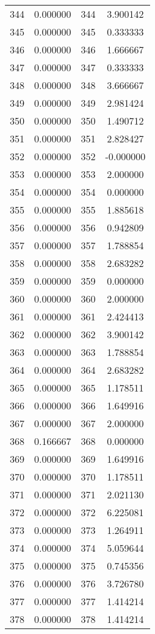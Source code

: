 \documentclass[12pt]{article}
\begin{document}
\begin{longtable}{@{}cccc@{}}
344 & 0.000000 & 344 & 3.900142 \\
345 & 0.000000 & 345 & 0.333333 \\
346 & 0.000000 & 346 & 1.666667 \\
347 & 0.000000 & 347 & 0.333333 \\
348 & 0.000000 & 348 & 3.666667 \\
349 & 0.000000 & 349 & 2.981424 \\
350 & 0.000000 & 350 & 1.490712 \\
351 & 0.000000 & 351 & 2.828427 \\
352 & 0.000000 & 352 & -0.000000 \\
353 & 0.000000 & 353 & 2.000000 \\
354 & 0.000000 & 354 & 0.000000 \\
355 & 0.000000 & 355 & 1.885618 \\
356 & 0.000000 & 356 & 0.942809 \\
357 & 0.000000 & 357 & 1.788854 \\
358 & 0.000000 & 358 & 2.683282 \\
359 & 0.000000 & 359 & 0.000000 \\
360 & 0.000000 & 360 & 2.000000 \\
361 & 0.000000 & 361 & 2.424413 \\
362 & 0.000000 & 362 & 3.900142 \\
363 & 0.000000 & 363 & 1.788854 \\
364 & 0.000000 & 364 & 2.683282 \\
365 & 0.000000 & 365 & 1.178511 \\
366 & 0.000000 & 366 & 1.649916 \\
367 & 0.000000 & 367 & 2.000000 \\
368 & 0.166667 & 368 & 0.000000 \\
369 & 0.000000 & 369 & 1.649916 \\
370 & 0.000000 & 370 & 1.178511 \\
371 & 0.000000 & 371 & 2.021130 \\
372 & 0.000000 & 372 & 6.225081 \\
373 & 0.000000 & 373 & 1.264911 \\
374 & 0.000000 & 374 & 5.059644 \\
375 & 0.000000 & 375 & 0.745356 \\
376 & 0.000000 & 376 & 3.726780 \\
377 & 0.000000 & 377 & 1.414214 \\
378 & 0.000000 & 378 & 1.414214 \\

\end{longtable}
\end{document}
